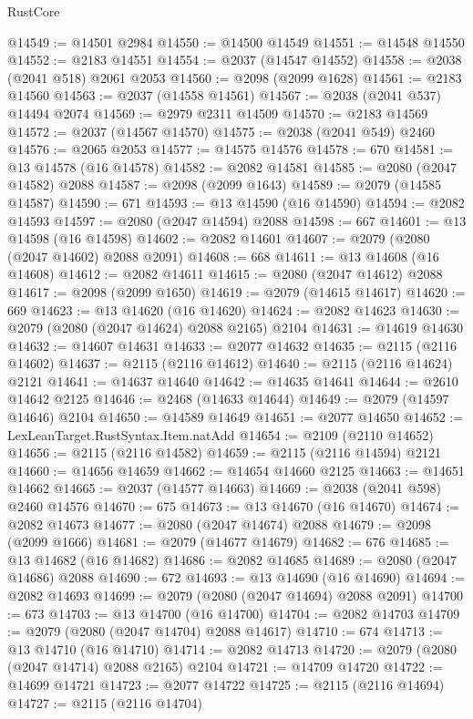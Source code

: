 \begin{lexlean}{RustCore}
\begin{coremodule}
@14549 := @14501 @2984
@14550 := @14500 @14549
@14551 := @14548 @14550
@14552 := @2183 @14551
@14554 := @2037 (@14547 @14552)
@14558 := @2038 (@2041 @518) @2061 @2053
@14560 := @2098 (@2099 @1628)
@14561 := @2183 @14560
@14563 := @2037 (@14558 @14561)
@14567 := @2038 (@2041 @537) @14494 @2074
@14569 := @2979 @2311 @14509
@14570 := @2183 @14569
@14572 := @2037 (@14567 @14570)
@14575 := @2038 (@2041 @549) @2460
@14576 := @2065 @2053
@14577 := @14575 @14576
@14578 := 670
@14581 := @13 @14578 (@16 @14578)
@14582 := @2082 @14581
@14585 := @2080 (@2047 @14582) @2088
@14587 := @2098 (@2099 @1643)
@14589 := @2079 (@14585 @14587)
@14590 := 671
@14593 := @13 @14590 (@16 @14590)
@14594 := @2082 @14593
@14597 := @2080 (@2047 @14594) @2088
@14598 := 667
@14601 := @13 @14598 (@16 @14598)
@14602 := @2082 @14601
@14607 := @2079 (@2080 (@2047 @14602) @2088 @2091)
@14608 := 668
@14611 := @13 @14608 (@16 @14608)
@14612 := @2082 @14611
@14615 := @2080 (@2047 @14612) @2088
@14617 := @2098 (@2099 @1650)
@14619 := @2079 (@14615 @14617)
@14620 := 669
@14623 := @13 @14620 (@16 @14620)
@14624 := @2082 @14623
@14630 := @2079 (@2080 (@2047 @14624) @2088 @2165) @2104
@14631 := @14619 @14630
@14632 := @14607 @14631
@14633 := @2077 @14632
@14635 := @2115 (@2116 @14602)
@14637 := @2115 (@2116 @14612)
@14640 := @2115 (@2116 @14624) @2121
@14641 := @14637 @14640
@14642 := @14635 @14641
@14644 := @2610 @14642 @2125
@14646 := @2468 (@14633 @14644)
@14649 := @2079 (@14597 @14646) @2104
@14650 := @14589 @14649
@14651 := @2077 @14650
@14652 := LexLeanTarget.RustSyntax.Item.natAdd
@14654 := @2109 (@2110 @14652)
@14656 := @2115 (@2116 @14582)
@14659 := @2115 (@2116 @14594) @2121
@14660 := @14656 @14659
@14662 := @14654 @14660 @2125
@14663 := @14651 @14662
@14665 := @2037 (@14577 @14663)
@14669 := @2038 (@2041 @598) @2460 @14576
@14670 := 675
@14673 := @13 @14670 (@16 @14670)
@14674 := @2082 @14673
@14677 := @2080 (@2047 @14674) @2088
@14679 := @2098 (@2099 @1666)
@14681 := @2079 (@14677 @14679)
@14682 := 676
@14685 := @13 @14682 (@16 @14682)
@14686 := @2082 @14685
@14689 := @2080 (@2047 @14686) @2088
@14690 := 672
@14693 := @13 @14690 (@16 @14690)
@14694 := @2082 @14693
@14699 := @2079 (@2080 (@2047 @14694) @2088 @2091)
@14700 := 673
@14703 := @13 @14700 (@16 @14700)
@14704 := @2082 @14703
@14709 := @2079 (@2080 (@2047 @14704) @2088 @14617)
@14710 := 674
@14713 := @13 @14710 (@16 @14710)
@14714 := @2082 @14713
@14720 := @2079 (@2080 (@2047 @14714) @2088 @2165) @2104
@14721 := @14709 @14720
@14722 := @14699 @14721
@14723 := @2077 @14722
@14725 := @2115 (@2116 @14694)
@14727 := @2115 (@2116 @14704)

\end{coremodule}
\end{lexlean}
